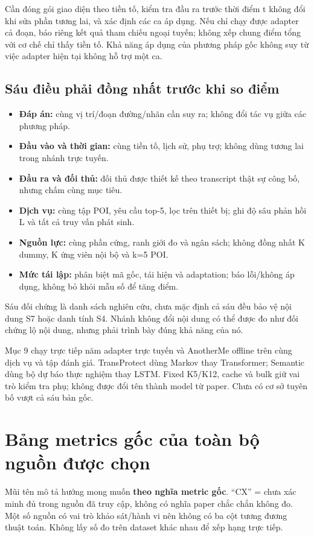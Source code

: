 \documentclass[10pt,a4paper]{article}
\begin{document}
Cần đóng gói giao diện theo tiền tố, kiểm tra đầu ra trước thời điểm t không đổi khi sửa phần tương lai, và xác định các ca áp dụng. Nếu chỉ chạy được adapter cả đoạn, báo riêng kết quả tham chiếu ngoại tuyến; không xếp chung điểm tổng với cơ chế chỉ thấy tiền tố. Khả năng áp dụng của phương pháp gốc không suy từ việc adapter hiện tại không hỗ trợ một ca.

\subsection{Sáu điều phải đồng nhất trước khi so điểm}
\begin{itemize}
\item \textbf{Đáp án:} cùng vị trí/đoạn đường/nhãn cần suy ra; không đổi tác vụ giữa các phương pháp.
\item \textbf{Đầu vào và thời gian:} cùng tiền tố, lịch sử, phụ trợ; không dùng tương lai trong nhánh trực tuyến.
\item \textbf{Đầu ra và đối thủ:} đối thủ được thiết kế theo transcript thật sự công bố, nhưng chấm cùng mục tiêu.
\item \textbf{Dịch vụ:} cùng tập POI, yêu cầu top-5, lọc trên thiết bị; ghi độ sâu phản hồi L và tất cả truy vấn phát sinh.
\item \textbf{Nguồn lực:} cùng phần cứng, ranh giới đo và ngân sách; không đồng nhất K dummy, K ứng viên nội bộ và k=5 POI.
\item \textbf{Mức tái lập:} phân biệt mã gốc, tái hiện và adaptation; báo lỗi/không áp dụng, không bỏ khỏi mẫu số để tăng điểm.
\end{itemize}
Sáu đối chứng là danh sách nghiên cứu, chưa mặc định cả sáu đều bảo vệ nội dung S7 hoặc danh tính S4. Nhánh không đổi nội dung có thể được đo như đối chứng lộ nội dung, nhưng phải trình bày đúng khả năng của nó.

Mục 9 chạy trực tiếp năm adapter trực tuyến và AnotherMe offline trên cùng dịch vụ và tập đánh giá. TransProtect dùng Markov thay Transformer; Semantic dùng bộ dự báo thực nghiệm thay LSTM. Fixed K5/K12, cache và bulk giữ vai trò kiểm tra phụ; không được đổi tên thành model từ paper. Chưa có cơ sở tuyên bố vượt cả sáu bản gốc.


\clearpage
\section{Bảng metrics gốc của toàn bộ nguồn được chọn}
Mũi tên mô tả hướng mong muốn \textbf{theo nghĩa metric gốc}. “CX” = chưa xác minh đủ trong nguồn đã truy cập, không có nghĩa paper chắc chắn không đo. Một số nguồn có vai trò khảo sát/hành vi nên không có ba cột tương đương thuật toán. Không lấy số đo trên dataset khác nhau để xếp hạng trực tiếp.
\end{document}
